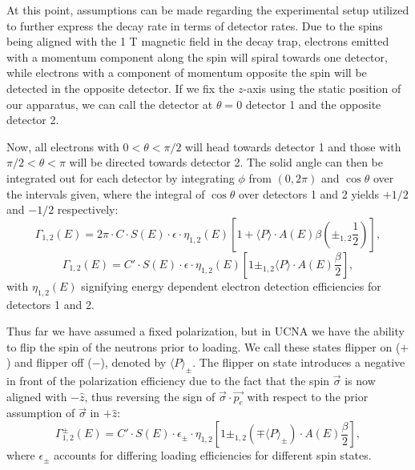 At this point, assumptions can be made regarding the experimental setup utilized
to further express the decay rate in terms of detector rates. Due to the spins
being aligned with the 1 T magnetic field in the decay trap, electrons emitted with
a momentum component along the spin will spiral towards one detector, while electrons
with a component of momentum opposite the spin will be detected in the opposite 
detector. If we fix the $z$-axis using the static position of our
apparatus, we can call the detector at $\theta=0$ detector
1 and the opposite detector 2. 

Now, all electrons with $0 < \theta < \pi/2$ will head towards detector 1 and those 
with $\pi/2 < \theta < \pi$ will be directed towards detector 2. The solid angle can
then be integrated out for each detector by integrating $\phi$ from $(0,2\pi)$ and
$\cos\theta$ over the intervals given, where the integral of $\cos\theta$ over detectors
1 and 2 yields $+1/2$ and $-1/2$ respectively: 
%
\begin{equation} 
  \Gamma_{1,2}\left(E\right)= 2\pi \cdot C \cdot S(E) \cdot
  \epsilon \cdot \eta_{1,2}(E) \left[ 1+ \langle P \rangle\cdot A(E)\beta
    \left(\pm_{1,2}\frac{1}{2}\right) \right],
\end{equation} 
%
\begin{equation} 
  \Gamma_{1,2}\left(E\right)=C' \cdot S(E) \cdot \epsilon \cdot \eta_{1,2}(E)
  \left[ 1 \pm_{1,2} \langle P \rangle\cdot A(E) \frac{\beta}{2} \right],
\end{equation} 
%
\noindent with $\eta_{1,2}(E)$ signifying energy dependent electron
detection efficiencies for detectors 1 and 2. 

Thus far we have assumed a fixed polarization, but in UCNA we have the ability to 
flip the spin of the neutrons prior to loading. We call these states flipper on ($+$) 
and flipper off ($-$), denoted by $\langle P \rangle_{\pm}$. The flipper on state introduces a
negative in front of the polarization efficiency
due to the fact that the spin $\vec{\sigma}$ is now aligned with $-\hat{z}$, thus reversing the sign
of $\vec{\sigma}\cdot\vec{p_{e}}$ with respect to the prior assumption of $\vec{\sigma}$ in $+\hat{z}$:
%
\begin{equation}
  \Gamma_{1,2}^{\pm}\left(E\right)=C' \cdot S(E) \cdot \epsilon_{\pm} \cdot \eta_{1,2}
  \left[ 1 \pm_{1,2} 
\left(\mp \langle P \rangle_{\pm}\right) \cdot A(E) \frac{\beta}{2} \right],
\end{equation} 
%
\noindent where $\epsilon_{\pm}$ accounts for differing loading efficiencies for 
different spin states.

